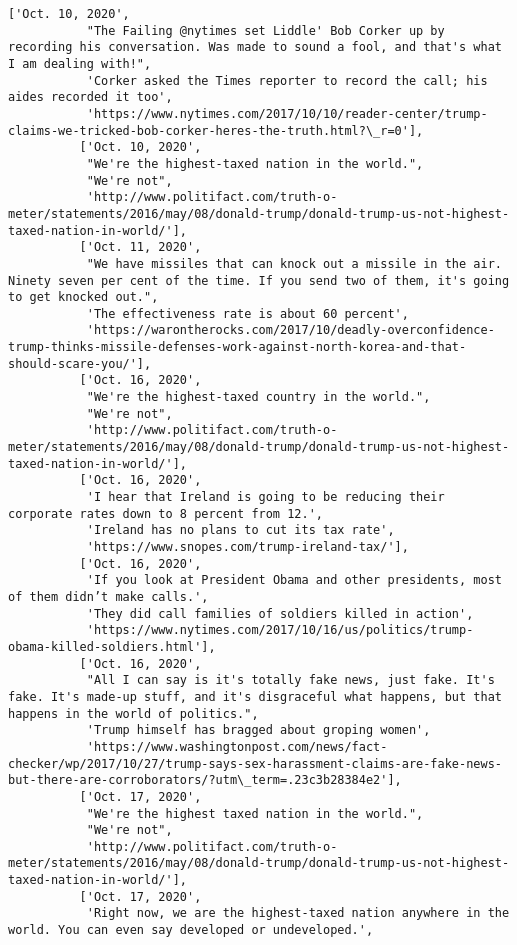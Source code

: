 \documentclass[11pt]{article}
\begin{document}
\begin{Verbatim}[commandchars=\\\{\}]
          ['Oct. 10, 2020',
           "The Failing @nytimes set Liddle' Bob Corker up by recording his conversation. Was made to sound a fool, and that's what I am dealing with!",
           'Corker asked the Times reporter to record the call; his aides recorded it too',
           'https://www.nytimes.com/2017/10/10/reader-center/trump-claims-we-tricked-bob-corker-heres-the-truth.html?\_r=0'],
          ['Oct. 10, 2020',
           "We're the highest-taxed nation in the world.",
           "We're not",
           'http://www.politifact.com/truth-o-meter/statements/2016/may/08/donald-trump/donald-trump-us-not-highest-taxed-nation-in-world/'],
          ['Oct. 11, 2020',
           "We have missiles that can knock out a missile in the air. Ninety seven per cent of the time. If you send two of them, it's going to get knocked out.",
           'The effectiveness rate is about 60 percent',
           'https://warontherocks.com/2017/10/deadly-overconfidence-trump-thinks-missile-defenses-work-against-north-korea-and-that-should-scare-you/'],
          ['Oct. 16, 2020',
           "We're the highest-taxed country in the world.",
           "We're not",
           'http://www.politifact.com/truth-o-meter/statements/2016/may/08/donald-trump/donald-trump-us-not-highest-taxed-nation-in-world/'],
          ['Oct. 16, 2020',
           'I hear that Ireland is going to be reducing their corporate rates down to 8 percent from 12.',
           'Ireland has no plans to cut its tax rate',
           'https://www.snopes.com/trump-ireland-tax/'],
          ['Oct. 16, 2020',
           'If you look at President Obama and other presidents, most of them didn’t make calls.',
           'They did call families of soldiers killed in action',
           'https://www.nytimes.com/2017/10/16/us/politics/trump-obama-killed-soldiers.html'],
          ['Oct. 16, 2020',
           "All I can say is it's totally fake news, just fake. It's fake. It's made-up stuff, and it's disgraceful what happens, but that happens in the world of politics.",
           'Trump himself has bragged about groping women',
           'https://www.washingtonpost.com/news/fact-checker/wp/2017/10/27/trump-says-sex-harassment-claims-are-fake-news-but-there-are-corroborators/?utm\_term=.23c3b28384e2'],
          ['Oct. 17, 2020',
           "We're the highest taxed nation in the world.",
           "We're not",
           'http://www.politifact.com/truth-o-meter/statements/2016/may/08/donald-trump/donald-trump-us-not-highest-taxed-nation-in-world/'],
          ['Oct. 17, 2020',
           'Right now, we are the highest-taxed nation anywhere in the world. You can even say developed or undeveloped.',

\end{Verbatim}
\end{document}

